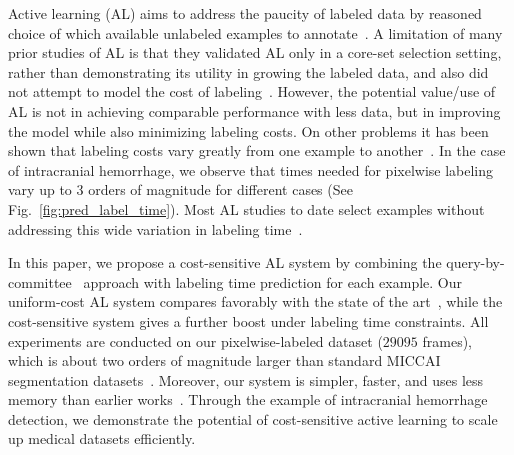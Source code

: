 \documentclass{llncs}
\begin{document}
Active learning (AL) aims to address the paucity of labeled data by reasoned choice of which available unlabeled examples to annotate~\cite{settles2008active,yang2017suggestive,seung1992query,lewis1994sequential,mahapatra2013semi}. A limitation of many prior studies of AL is that they validated AL only in a core-set selection setting,~\cite{sener2018active} %
rather than demonstrating its utility in growing the labeled data, and also did not attempt to model the cost of labeling~\cite{settles2008active,yang2017suggestive,mahapatra2013semi}. However, the potential value/use of AL is not in achieving comparable performance with less data, but in improving the model while also minimizing labeling costs.  On other problems it has been shown that labeling costs vary greatly from one example to another~\cite{settles2008active,settles2012active,tomanek2010resource}. In the case of intracranial hemorrhage, we observe that times needed for pixelwise labeling vary up to 3 orders of magnitude for different cases (See Fig.~\ref{fig:pred_label_time}). Most AL studies to date select examples without addressing this wide variation in labeling time~\cite{yang2017suggestive,seung1992query,lewis1994sequential,sener2018active,mahapatra2013semi}.%

In this paper, we propose a cost-sensitive AL system by combining the query-by-committee~\cite{seung1992query} approach with labeling time prediction for each example. Our uniform-cost AL system compares favorably with the state of the art~\cite{yang2017suggestive}, while the cost-sensitive system gives a further boost under labeling time constraints. All experiments are conducted on our pixelwise-labeled dataset ($29095$ frames), which is about two orders of magnitude larger than standard MICCAI segmentation datasets~\cite{sirinukunwattana2017gland,zhang2016coarse}.
Moreover, our system is simpler, faster, and uses less memory than earlier works~\cite{yang2017suggestive,sener2018active}. Through the example of intracranial hemorrhage detection, we demonstrate the potential of cost-sensitive active learning to scale up medical datasets efficiently.  
\end{document}
